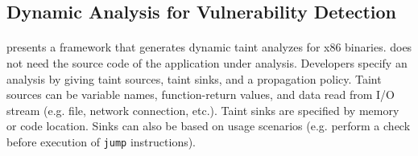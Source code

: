 \begin{comment}
\paragraph{Context-Sensitivity}

\subsection{Dynamic Analysis}
Dynamic analysis performs on running programs, and in general
do not need access to the source code of the program under analysis
\cite{Kiezun:2009:Ardilla, Clause:2007:Dytan, Balzarotti:2008:SCS4}.
A dynamic analysis is interprocedural and context-sensitive in
nature because it runs along with the analyzed program. 

A dynamic taint analysis instrument program memory locations
that correspond to taint sources, taint sinks, and where taint
propagation shall occur. For managed languages (e.g. Java, C\#),
developers may also choose to instrument programs at the level
of the virtual machine or runtime system. \cite{Livshits:2012:DTTMR}
provides a taxonomy on the topic. 
The major bottleneck of dynamic analysis lies in the execution
overhead that incurs the program instrumentation.

\textit{Forward symbolic execution} is a technique that builds
a logical formula to represent a program execution. The logical
formula enables developers to reason about different program input.
It is common to combine forward symbolic execution and dynamic
taint analysis. \cite{Schwartz:2010:YEW} discusses
this combination and possible implementation choices.
\end{comment}

\subsection{Dynamic Analysis for Vulnerability Detection}
\paragraph{\dytan}\cite{Clause:2007:Dytan} presents a framework
that generates dynamic taint analyzes for x$86$ binaries.
\dytan does not need the source code of the application under analysis.
Developers specify an analysis by giving taint sources, taint sinks,
and a propagation policy. Taint sources can be variable names,
function-return values, and data read from I/O stream (e.g. file, 
network connection, etc.). Taint sinks are specified by memory or code
location. Sinks can also be based on usage scenarios (e.g. 
perform a check before execution of \texttt{jump} instructions).

